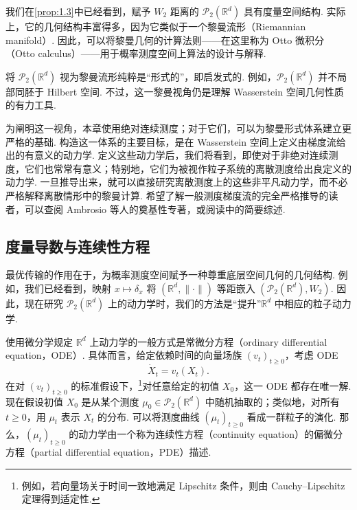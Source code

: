 我们在\autoref{prop:1.3}中已经看到，赋予 $W_2$ 距离的 $\mathcal P_2(\mathbb R^d)$ 具有度量空间结构. 实际上，它的几何结构丰富得多，因为它类似于一个黎曼流形（Riemannian manifold）. 因此，可以将黎曼几何的计算法则——在这里称为 Otto 微积分（Otto calculus）——用于概率测度空间上算法的设计与解释.

将 $\mathcal P_2(\mathbb R^d)$ 视为黎曼流形纯粹是“形式的”，即启发式的. 例如，$\mathcal P_2(\mathbb R^d)$ 并不局部同胚于 Hilbert 空间. 不过，这一黎曼视角仍是理解 Wasserstein 空间几何性质的有力工具.

为阐明这一视角，本章使用绝对连续测度；对于它们，可以为黎曼形式体系建立更严格的基础. 构造这一体系的主要目标，是在 Wasserstein 空间上定义由梯度流给出的有意义的动力学. 定义这些动力学后，我们将看到，即使对于非绝对连续测度，它们也常常有意义；特别地，它们为被视作粒子系统的离散测度给出良定义的动力学. 一旦推导出来，就可以直接研究离散测度上的这些非平凡动力学，而不必严格解释离散情形中的黎曼计算. 希望了解一般测度梯度流的完全严格推导的读者，可以查阅 Ambrosio 等人的奠基性专著\cite{ref18}，或阅读\cite{ref282}中的简要综述.

\subsection{度量导数与连续性方程}\label{sec:5.1}

最优传输的作用在于，为概率测度空间赋予一种尊重底层空间几何的几何结构. 例如，我们已经看到，映射 $x\mapsto\delta_x$ 将 $(\mathbb R^d,\|\cdot\|)$ 等距嵌入 $(\mathcal P_2(\mathbb R^d),W_2)$. 因此，现在研究 $\mathcal P_2(\mathbb R^d)$ 上的动力学时，我们的方法是“提升”$\mathbb R^d$ 中相应的粒子动力学.

使用微分学规定 $\mathbb R^d$ 上动力学的一般方式是常微分方程（ordinary differential equation，ODE）. 具体而言，给定依赖时间的向量场族 $(v_t)_{t\geq0}$，考虑 ODE
\begin{equation}\label{eq:5.1}
\dot X_t=v_t(X_t).
\end{equation}
在对 $(v_t)_{t\geq0}$ 的标准假设下，\footnote{例如，若向量场关于时间一致地满足 Lipschitz 条件，则由 Cauchy--Lipschitz 定理得到适定性.}对任意给定的初值 $X_0$，这一 ODE 都存在唯一解. 现在假设初值 $X_0$ 是从某个测度 $\mu_0\in\mathcal P_2(\mathbb R^d)$ 中随机抽取的；类似地，对所有 $t\geq0$，用 $\mu_t$ 表示 $X_t$ 的分布. 可以将测度曲线 $(\mu_t)_{t\geq0}$ 看成一群粒子的演化. 那么，$(\mu_t)_{t\geq0}$ 的动力学由一个称为连续性方程（continuity equation）的偏微分方程（partial differential equation，PDE）描述.

